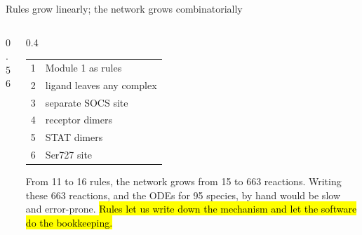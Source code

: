\documentclass[aspectratio=169,10pt,t]{beamer}
\begin{document}
\begin{frame}{Rules grow linearly; the network grows combinatorially}
  \begin{columns}[c]
    \begin{column}{0.56\textwidth}
    \end{column}
    \begin{column}{0.4\textwidth}
      \small
      \begin{tabular}{@{}rl@{}}
        1 & Module 1 as rules \\
        2 & ligand leaves any complex \\
        3 & separate SOCS site \\
        4 & receptor dimers \\
        5 & STAT dimers \\
        6 & Ser727 site \\
      \end{tabular}
      \vskip3mm
      From 11 to 16 rules, the network grows from 15 to 663 reactions.
      \vskip2mm
      Writing these 663 reactions, and the ODEs for 95 species, by hand would be
      slow and error-prone. \hl{Rules let us write down the mechanism and let the
      software do the bookkeeping.}
    \end{column}
  \end{columns}
\end{frame}
\end{document}
